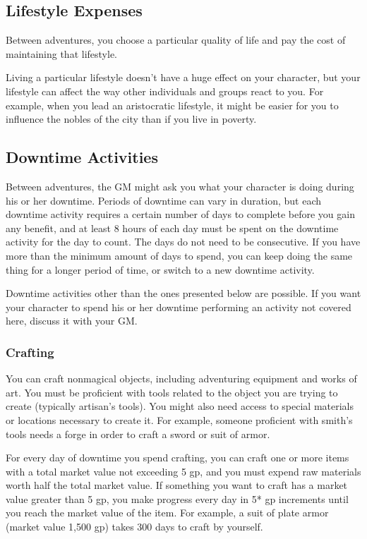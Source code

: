 \subsection{Lifestyle Expenses}

Between adventures, you choose a particular quality of life and pay the cost of maintaining that lifestyle.

Living a particular lifestyle doesn't have a huge effect on your character, but your lifestyle can affect the way other individuals and groups react to you. For example, when you lead an aristocratic lifestyle, it might be easier for you to influence the nobles of the city than if you live in poverty.

\subsection{Downtime Activities}

Between adventures, the GM might ask you what your character is doing during his or her downtime. Periods of downtime can vary in duration, but each downtime activity requires a certain number of days to complete before you gain any benefit, and at least 8 hours of each day must be spent on the downtime activity for the day to count. The days do not need to be consecutive. If you have more than the minimum amount of days to spend, you can keep doing the same thing for a longer period of time, or switch to a new downtime activity.

Downtime activities other than the ones presented below are possible. If you want your character to spend his or her downtime performing an activity not covered here, discuss it with your GM.

\subsubsection{Crafting}

You can craft nonmagical objects, including adventuring equipment and works of art. You must be proficient with tools related to the object you are trying to create (typically artisan's tools). You might also need access to special materials or locations necessary to create it. For example, someone proficient with smith's tools needs a forge in order to craft a sword or suit of armor.

For every day of downtime you spend crafting, you can craft one or more items with a total market value not exceeding 5 gp, and you must expend raw materials worth half the total market value. If something you want to craft has a market value greater than 5 gp, you make progress every day in 5* gp increments until you reach the market value of the item. For example, a suit of plate armor (market value 1,500 gp) takes 300 days to craft by yourself.

